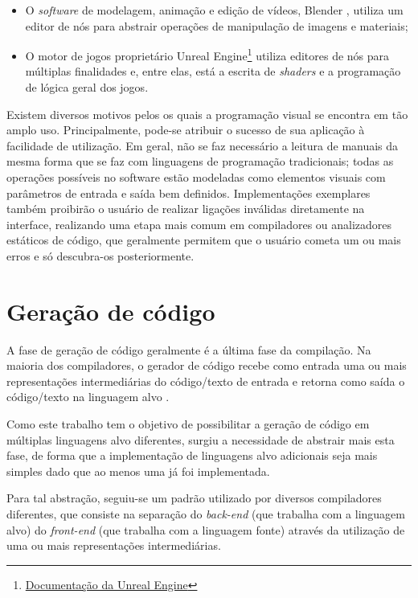 \documentclass[
	12pt,				%
	openright,			%
	oneside,			%
	a4paper,			%
	main=brazil,
	english,			%
	]{ufsj-abntex2}
\begin{document}
\begin{itemize}
    \item O \textit{software} de modelagem, animação e edição de vídeos, Blender \cite{blender}, utiliza um editor de nós para abstrair operações de manipulação de imagens e materiais;

    \item O motor de jogos proprietário Unreal Engine\footnote{\href{https://www.unrealengine.com/}{Documentação da Unreal Engine}} utiliza editores de nós para múltiplas finalidades e, entre elas, está a escrita de \textit{shaders} e a programação de lógica geral dos jogos.
\end{itemize}

Existem diversos motivos pelos os quais a programação visual se encontra em tão amplo uso. Principalmente, pode-se atribuir o sucesso de sua aplicação à facilidade de utilização. Em geral, não se faz necessário a leitura de manuais da mesma forma que se faz com linguagens de programação tradicionais; todas as operações possíveis no software estão modeladas como elementos visuais com parâmetros de entrada e saída bem definidos. Implementações exemplares também proibirão o usuário de realizar ligações inválidas diretamente na interface, realizando uma etapa mais comum em compiladores ou analizadores estáticos de código, que geralmente permitem que o usuário cometa um ou mais erros e só descubra-os posteriormente.

\section{Geração de código}

A fase de geração de código geralmente é a última fase da compilação. Na maioria dos compiladores, o gerador de código recebe como entrada uma ou mais representações intermediárias do código/texto de entrada e retorna como saída o código/texto na linguagem alvo \cite{dragonBook}. 

Como este trabalho tem o objetivo de possibilitar a geração de código em múltiplas linguagens alvo diferentes, surgiu a necessidade de abstrair mais esta fase, de forma que a implementação de linguagens alvo adicionais seja mais simples dado que ao menos uma já foi implementada.

Para tal abstração, seguiu-se um padrão utilizado por diversos compiladores diferentes, que consiste na separação do \textit{back-end} (que trabalha com a linguagem alvo) do \textit{front-end} (que trabalha com a linguagem fonte) através da utilização de uma ou mais representações intermediárias. 
\end{document}
